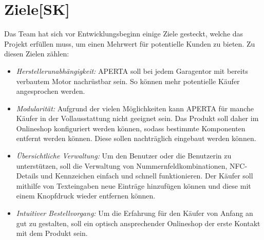 \section{Ziele[SK]}
Das Team hat sich vor Entwicklungsbeginn einige Ziele gesteckt, welche das Projekt erfüllen muss, um einen Mehrwert für potentielle Kunden zu bieten. Zu diesen Zielen zählen:
\begin{itemize}
    \item \textit{Herstellerunabhängigkeit:} APERTA soll bei jedem Garagentor mit bereits verbautem Motor nachrüstbar sein. So können mehr potentielle Käufer angesprochen werden.
    \item \textit{Modularität:} Aufgrund der vielen Möglichkeiten kann APERTA für manche Käufer in der Vollausstattung nicht geeignet sein. Das Produkt soll daher im Onlineshop konfiguriert werden können, sodass bestimmte Komponenten entfernt werden können. Diese sollen nachträglich eingebaut werden können.
    \item \textit{Übersichtliche Verwaltung:} Um den Benutzer oder die Benutzerin zu unterstützen, soll die Verwaltung von Nummernfeldkombinationen, NFC-Details und Kennzeichen einfach und schnell funktionieren. Der Käufer soll mithilfe von Texteingaben neue Einträge hinzufügen können und diese mit einem Knopfdruck wieder entfernen können.
    \item \textit{Intuitiver Bestellvorgang:}
    Um die Erfahrung für den Käufer von Anfang an gut zu gestalten, soll ein optisch ansprechender Onlineshop der erste Kontakt mit dem Produkt sein.
  \end{itemize}
